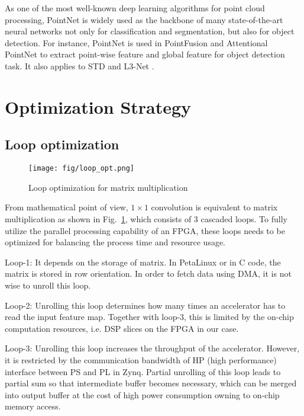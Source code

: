 \documentclass[conference]{IEEEtran}
\begin{document}
As one of the most well-known deep learning algorithms for point cloud processing, PointNet is widely used as the backbone of many state-of-the-art neural networks not only for classification and segmentation, but also for object detection. For instance, PointNet is used in PointFusion \cite{xu2018pointfusion} and Attentional PointNet \cite{paigwar2019attentional} to extract point-wise feature and global feature for object detection task. It also applies to STD \cite{yang2019std} and L3-Net \cite{lu2019l3}.

\section{Optimization Strategy}\label{sec:optimize}
\subsection{Loop optimization}
\begin{figure}[htbp]
    \centering
    \texttt{[image: fig/loop\_opt.png]}
    \caption{Loop optimization for matrix multiplication}
    \label{fig:loop_opt}
\end{figure}

From mathematical point of view, $1\times 1$ convolution is equivalent to matrix multiplication as shown in Fig.~\ref{fig:loop_opt}, which consists of 3 cascaded loops. To fully utilize the parallel processing capability of an FPGA, these loops needs to be optimized \cite{qiu2016going}\cite{ma2017optimizing} for balancing the process time and resource usage.

Loop-1: It depends on the storage of matrix. In PetaLinux or in C code, the matrix is stored in row orientation. In order to fetch data using DMA, it is not wise to unroll this loop.

Loop-2: Unrolling this loop determines how many times an accelerator has to read the input feature map. Together with loop-3, this is limited by the on-chip computation resources, i.e. DSP slices on the FPGA in our case.

Loop-3: Unrolling this loop increases the throughput of the accelerator. However, it is restricted by the communication bandwidth of HP (high performance) interface between PS and PL in Zynq. Partial unrolling of this loop leads to partial sum so that intermediate buffer becomes necessary, which can be merged into output buffer at the cost of high power consumption owning to on-chip memory access.
\end{document}
